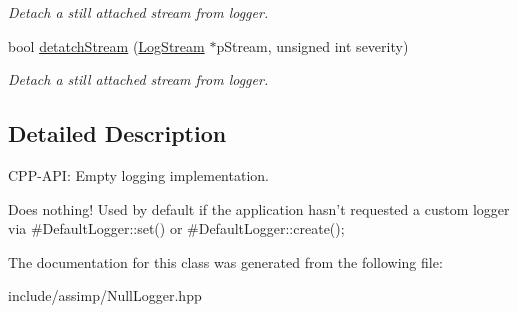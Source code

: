 \begin{DoxyCompactItemize}
\begin{DoxyCompactList}\small\item\em \-Detach a still attached stream from logger. \end{DoxyCompactList}\item 
\hypertarget{classAssimp_1_1NullLogger_ab49b14a0045aab73b813a448b5aa77b4}{bool \hyperlink{classAssimp_1_1NullLogger_ab49b14a0045aab73b813a448b5aa77b4}{detatch\-Stream} (\hyperlink{classAssimp_1_1LogStream}{\-Log\-Stream} $\ast$p\-Stream, unsigned int severity)}\label{classAssimp_1_1NullLogger_ab49b14a0045aab73b813a448b5aa77b4}

\begin{DoxyCompactList}\small\item\em \-Detach a still attached stream from logger. \end{DoxyCompactList}\end{DoxyCompactItemize}


\subsection{\-Detailed \-Description}
\-C\-P\-P-\/\-A\-P\-I\-: \-Empty logging implementation. 

\-Does nothing! \-Used by default if the application hasn't requested a custom logger via \#\-Default\-Logger\-::set() or \#\-Default\-Logger\-::create(); 

\-The documentation for this class was generated from the following file\-:\begin{DoxyCompactItemize}
\item 
include/assimp/\-Null\-Logger.\-hpp\end{DoxyCompactItemize}
